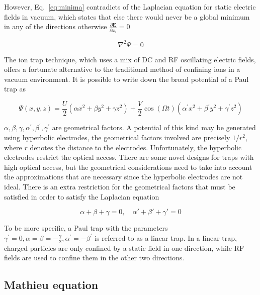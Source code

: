 However, Eq.~\eqref{eq:minima} contradicts of the Laplacian equation for static electric fields in vacuum, which states that else there would never be a global minimum in any of the directions otherwise $\frac{\partial \mathbf{E}}{\partial x_i}=0$

\begin{equation}
    \nabla^2 \Psi=0
\end{equation}


The ion trap technique, which uses a mix of DC and RF oscillating electric fields, offers a fortunate alternative to the traditional method of confining ions in a vacuum environment. It is possible to write down the broad potential of a Paul trap as

\begin{equation}\label{eq:rfpotential}
    \Psi(x, y, z)=\frac{U}{2}\left(\alpha x^2+\beta y^2+\gamma z^2\right)+\frac{V}{2} \cos (\Omega t)\left(\alpha^{\prime} x^2+\beta^{\prime} y^2+\gamma^{\prime} z^2\right)
\end{equation}

$\alpha, \beta, \gamma, \alpha^{\prime}, \beta^{\prime}, \gamma^{\prime}$ are geometrical factors. A potential of this kind may be generated using hyperbolic electrodes, the geometrical factors involved are precisely $1 / r^2$, where $r$ denotes the distance to the electrodes. Unfortunately, the hyperbolic electrodes restrict the optical access. There are some novel designs for traps with high optical access, but the geometrical considerations need to take into account the approximations that are necessary since the hyperbolic electrodes are not ideal. There is an extra restriction for the geometrical factors that must be satisfied in order to satisfy the Laplacian equation

\begin{equation}
    \alpha+\beta+\gamma=0,\quad \alpha'+\beta'+\gamma'=0
\end{equation}

To be more specific, a Paul trap with the parameters $\gamma^{\prime}=0, \alpha=\beta=-\frac{\gamma}{2}, \alpha^{\prime}=-\beta^{\prime}$ is referred to as a linear trap. In a linear trap, charged particles are only confined by a static field in one direction, while RF fields are used to confine them in the other two directions.

\subsection{Mathieu equation}

